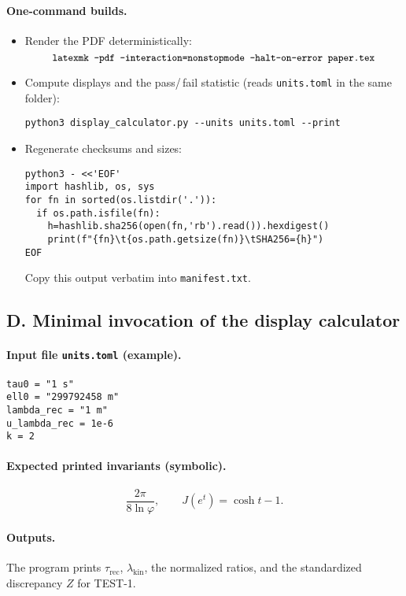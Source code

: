 \documentclass[11pt]{article}
\theoremstyle{plain}
\theoremstyle{definition}
\theoremstyle{remark}
\begin{document}
\paragraph{One-command builds.}
\begin{itemize}
  \item Render the PDF deterministically:
\[
\texttt{\small latexmk -pdf -interaction=nonstopmode -halt-on-error paper.tex}
\]
  \item Compute displays and the pass/\,fail statistic (reads \texttt{units.toml} in the same folder):
\begin{verbatim}
python3 display_calculator.py --units units.toml --print
\end{verbatim}
  \item Regenerate checksums and sizes:
\begin{verbatim}
python3 - <<'EOF'
import hashlib, os, sys
for fn in sorted(os.listdir('.')):
  if os.path.isfile(fn):
    h=hashlib.sha256(open(fn,'rb').read()).hexdigest()
    print(f"{fn}\t{os.path.getsize(fn)}\tSHA256={h}")
EOF
\end{verbatim}
Copy this output verbatim into \texttt{manifest.txt}.
\end{itemize}

\subsection*{D. Minimal invocation of the display calculator}
\paragraph{Input file \texttt{units.toml} (example).}
\begin{verbatim}
tau0 = "1 s"
ell0 = "299792458 m"
lambda_rec = "1 m"
u_lambda_rec = 1e-6
k = 2
\end{verbatim}
\paragraph{Expected printed invariants (symbolic).}
\[
\frac{2\pi}{8\ln\varphi},\qquad
J(e^{t})=\cosh t-1.
\]
\paragraph{Outputs.} The program prints \(\tau_{\mathrm{rec}}\), \(\lambda_{\mathrm{kin}}\), the normalized ratios, and the standard\-ized discrepancy \(Z\) for TEST-1.
\end{document}
